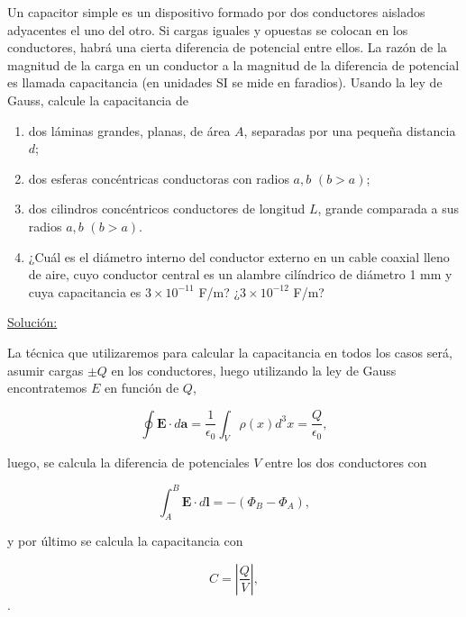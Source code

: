 \documentclass[a4paper,10pt]{article}
\numberwithin{equation}{section}
\begin{document}
Un capacitor simple es un dispositivo formado por dos conductores aislados 
adyacentes el uno del otro. Si cargas iguales y opuestas se colocan en los 
conductores, habrá una cierta diferencia de potencial entre ellos. La razón de 
la magnitud de la carga en un conductor a la magnitud de la diferencia de 
potencial es llamada capacitancia (en unidades SI se mide en faradios). Usando la 
ley de Gauss, calcule la capacitancia de 

\begin{enumerate}[label=\textbf{(\alph*)}]
 \item dos láminas grandes, planas, de área $A$, separadas por una pequeña 
 distancia $d$;
 \item dos esferas concéntricas conductoras con radios $a,b$ $(b > a)$;
 \item dos cilindros concéntricos conductores de longitud $L$, grande comparada 
 a sus radios $a,b$ $(b > a)$.
 \item ¿Cuál es el diámetro interno del conductor externo en un cable coaxial 
 lleno de aire, cuyo conductor central es un alambre cilíndrico de diámetro 
 1 mm y cuya capacitancia es $3\times 10^{-11}$ F/m? ¿$3\times 10^{-12}$ F/m?
\end{enumerate}

\vspace{.3cm}

\underline{Solución:} \vspace{.3cm}

La técnica que utilizaremos para calcular la capacitancia en todos los casos será, 
asumir cargas $\pm Q$ en los conductores, luego utilizando la ley de Gauss encontratemos 
$E$ en función de $Q$, 

\begin{equation}
 \oint \mathbf{E} \cdot d\mathbf{a} = \frac{1}{\epsilon_0}\int_V \rho(x)d^3x = 
 \frac{Q}{\epsilon_0},
\end{equation}

luego, se calcula la diferencia de potenciales $V$ entre los dos conductores con 

\begin{equation}
 \int_A^B \mathbf{E} \cdot d\mathbf{l} = - (\Phi_B - \Phi_A),
\end{equation}

y por último se calcula la capacitancia con 

\begin{equation}
 C = \left|\frac{Q}{V}\right|,
\end{equation}.
\end{document}
